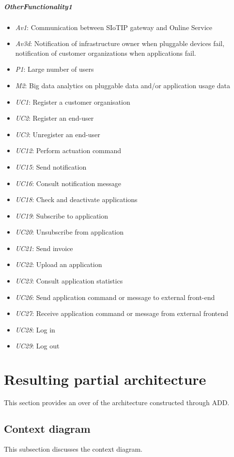 \documentclass[english]{sareport}
\begin{document}
\paragraph{OtherFunctionality1}
\begin{itemize}
	\item \emph{Av1}: Communication between SIoTIP gateway and Online Service
	\item \emph{Av3d}: Notification of infrastructure owner when pluggable devices fail, notification of customer organizations when applications fail.
	\item \emph{P1}: Large number of users
	\item \emph{M2}: Big data analytics on pluggable data and/or application usage data
	\item \emph{UC1}: Register a customer organisation
	\item \emph{UC2}: Register an end-user
	\item \emph{UC3}: Unregister an end-user
	\item \emph{UC12}: Perform actuation command
	\item \emph{UC15}: Send notification
	\item \emph{UC16}: Consult notification message
	\item \emph{UC18}: Check and deactivate applications
	\item \emph{UC19}: Subscribe to application
	\item \emph{UC20}: Unsubscribe from application
	\item \emph{UC21}: Send invoice
	\item \emph{UC22}: Upload an application
	\item \emph{UC23}: Consult application statistics
	\item \emph{UC26}: Send application command or message to external front-end
	\item \emph{UC27}: Receive application command or message from external frontend
	\item \emph{UC28}: Log in
	\item \emph{UC29}: Log out
\end{itemize}


\chapter{Resulting partial architecture}\label{sec:architecture}
This section provides an over of the architecture constructed through ADD\@.

\section{Context diagram}
This subsection discusses the context diagram.
\end{document}
